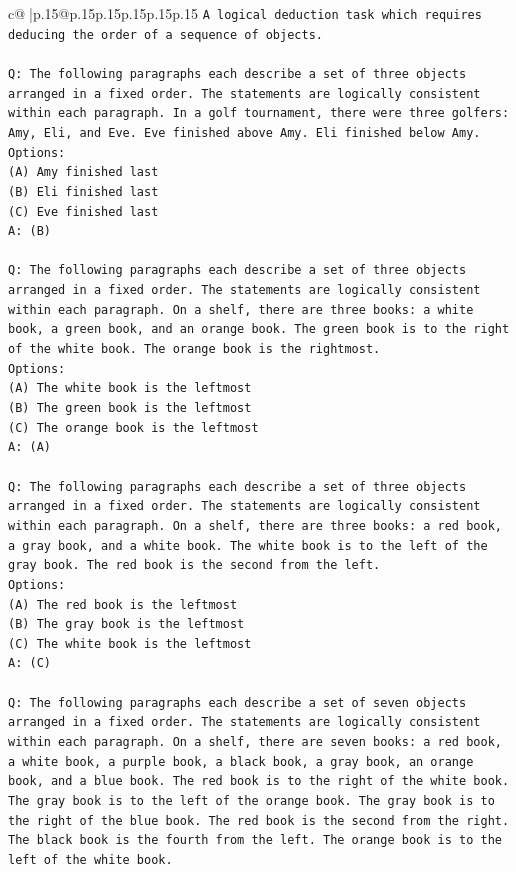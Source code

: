 \documentclass{article}
\begin{document}
{\begin{supertabular}{c@{$\;$}|p{.15\linewidth}@{}p{.15\linewidth}p{.15\linewidth}p{.15\linewidth}p{.15\linewidth}p{.15\linewidth}}
{{{\texttt{A logical deduction task which requires deducing the order of a sequence of objects.} \\
\\ 
\texttt{Q: The following paragraphs each describe a set of three objects arranged in a fixed order. The statements are logically consistent within each paragraph. In a golf tournament, there were three golfers: Amy, Eli, and Eve. Eve finished above Amy. Eli finished below Amy.} \\
\texttt{Options:} \\
\texttt{(A) Amy finished last} \\
\texttt{(B) Eli finished last} \\
\texttt{(C) Eve finished last} \\
\texttt{A: (B)} \\
\\ 
\texttt{Q: The following paragraphs each describe a set of three objects arranged in a fixed order. The statements are logically consistent within each paragraph. On a shelf, there are three books: a white book, a green book, and an orange book. The green book is to the right of the white book. The orange book is the rightmost.} \\
\texttt{Options:} \\
\texttt{(A) The white book is the leftmost} \\
\texttt{(B) The green book is the leftmost} \\
\texttt{(C) The orange book is the leftmost} \\
\texttt{A: (A)} \\
\\ 
\texttt{Q: The following paragraphs each describe a set of three objects arranged in a fixed order. The statements are logically consistent within each paragraph. On a shelf, there are three books: a red book, a gray book, and a white book. The white book is to the left of the gray book. The red book is the second from the left.} \\
\texttt{Options:} \\
\texttt{(A) The red book is the leftmost} \\
\texttt{(B) The gray book is the leftmost} \\
\texttt{(C) The white book is the leftmost} \\
\texttt{A: (C)} \\
\\ 
\texttt{Q: The following paragraphs each describe a set of seven objects arranged in a fixed order. The statements are logically consistent within each paragraph. On a shelf, there are seven books: a red book, a white book, a purple book, a black book, a gray book, an orange book, and a blue book. The red book is to the right of the white book. The gray book is to the left of the orange book. The gray book is to the right of the blue book. The red book is the second from the right. The black book is the fourth from the left. The orange book is to the left of the white book.} \\
}}}
\end{supertabular}}
\end{document}
